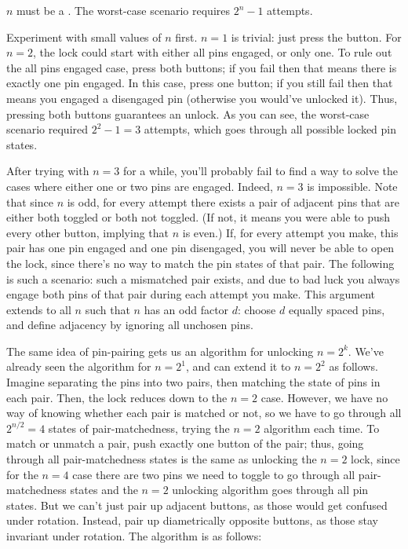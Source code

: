 \begin{solution}\hfil\medskip
  
    $n$ must be a . The worst-case scenario requires $\boxed{2^n - 1}$ attempts.\medskip

    Experiment with small values of $n$ first. $n = 1$ is trivial: just press the button. 
    For $n = 2$, the lock could start with either all pins engaged, or only one. To rule out 
    the all pins engaged case, press both buttons; if you fail then that means there is 
    exactly one pin engaged. In this case, press one button; if you still fail then that means 
    you engaged a disengaged pin (otherwise you would've unlocked it). Thus, pressing both 
    buttons guarantees an unlock. As you can see, the worst-case scenario required $2^2 - 1 = 3$ 
    attempts, which goes through all possible locked pin states.\medskip

    After trying with $n = 3$ for a while, you'll probably fail to find a way to solve the 
    cases where either one or two pins are engaged. Indeed, $n = 3$ is impossible. Note that 
    since $n$ is odd, for every attempt there exists a pair of adjacent pins that are either 
    both toggled or both not toggled. (If not, it means you were able to push every other 
    button, implying that $n$ is even.) If, for every attempt you make, this pair has one 
    pin engaged and one pin disengaged, you will never be able to open the lock, since there's 
    no way to match the pin states of that pair. The following is such a scenario: such a 
    mismatched pair exists, and due to bad luck you always engage both pins of that pair during 
    each attempt you make. This argument extends to all $n$ such that $n$ has an odd factor $d$: 
    choose $d$ equally spaced pins, and define adjacency by ignoring all unchosen pins. \medskip

    The same idea of pin-pairing gets us an algorithm for unlocking $n = 2^k$. We've already 
    seen the algorithm for $n = 2^1$, and can extend it to $n = 2^2$ as follows. Imagine separating 
    the pins into two pairs, then matching the state of pins in each pair. Then, the lock 
    reduces down to the $n = 2$ case. However, we have no way of knowing whether each pair 
    is matched or not, so we have to go through all $2^{n/2} = 4$ states of pair-matchedness, 
    trying the $n = 2$ algorithm each time. To match or unmatch a pair, push exactly one button 
    of the pair; thus, going through all pair-matchedness states is the same as unlocking the $n = 2$ 
    lock, since for the $n = 4$ case there are two pins we need to toggle to go through all pair-matchedness 
    states and the $n = 2$ unlocking algorithm goes through all pin states. But we can't just 
    pair up adjacent buttons, as those would get confused under rotation. Instead, pair up 
    diametrically opposite buttons, as those stay invariant under rotation. The algorithm 
    is as follows: 


\end{solution}

